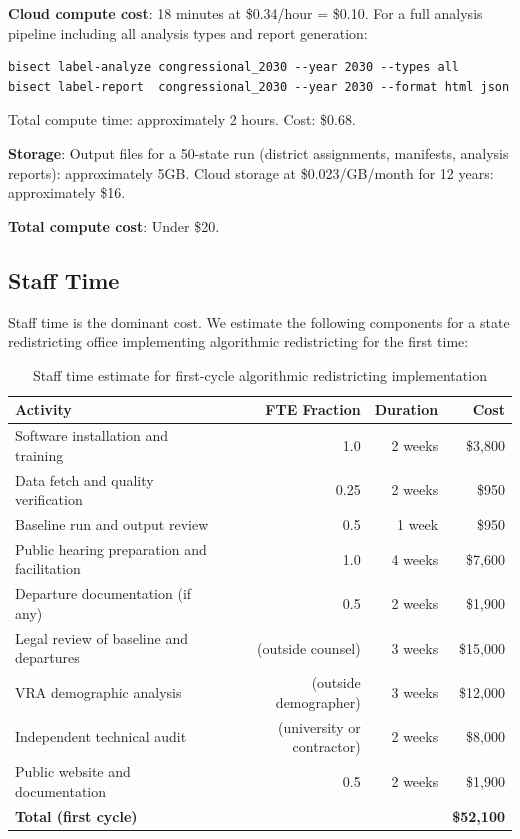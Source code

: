 \textbf{Cloud compute cost}: 18 minutes at \$0.34/hour = \$0.10. For a full analysis pipeline including all analysis types and report generation:
\begin{verbatim}
bisect label-analyze congressional_2030 --year 2030 --types all
bisect label-report  congressional_2030 --year 2030 --format html json
\end{verbatim}
Total compute time: approximately 2 hours. Cost: \$0.68.

\textbf{Storage}: Output files for a 50-state run (district assignments, manifests, analysis reports): approximately 5GB. Cloud storage at \$0.023/GB/month for 12 years: approximately \$16.

\textbf{Total compute cost}: Under \$20.

\subsection{Staff Time}

Staff time is the dominant cost. We estimate the following components for a state redistricting office implementing algorithmic redistricting for the first time:

\begin{table}[h]
\centering
\caption{Staff time estimate for first-cycle algorithmic redistricting implementation}
\label{tab:staff-time}
\begin{tabular}{@{}lrrr@{}}
\toprule
Activity & FTE Fraction & Duration & Cost \\
\midrule
Software installation and training          & 1.0 & 2 weeks & \$3,800 \\
Data fetch and quality verification         & 0.25 & 2 weeks & \$950 \\
Baseline run and output review              & 0.5 & 1 week  & \$950 \\
Public hearing preparation and facilitation & 1.0 & 4 weeks & \$7,600 \\
Departure documentation (if any)           & 0.5 & 2 weeks & \$1,900 \\
Legal review of baseline and departures    & (outside counsel) & 3 weeks & \$15,000 \\
VRA demographic analysis                   & (outside demographer) & 3 weeks & \$12,000 \\
Independent technical audit                & (university or contractor) & 2 weeks & \$8,000 \\
Public website and documentation           & 0.5 & 2 weeks & \$1,900 \\
\midrule
\textbf{Total (first cycle)}               & & & \textbf{\$52,100} \\
\bottomrule
\end{tabular}
\end{table}

